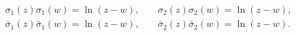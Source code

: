 \begin{equation}
\begin{array}{lcl}
\sigma_1 (z) \sigma_1 (w) = \ln(z-w),&\;& \sigma_2 (z) \sigma_2
(w) = \ln(z-w),
\nonumber\\
\bar{\sigma}_1 (z) \bar{\sigma}_1 (w) = \ln(z-w),
 &\;& \bar{\sigma}_2 (z) \bar{\sigma}_2 (w) =
\ln(z-w).
\end{array}
\end{equation}

